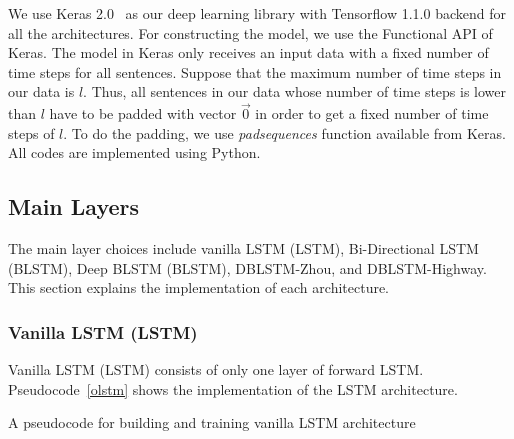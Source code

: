We use Keras 2.0~\citep{chollet2015} as our deep learning library with Tensorflow 1.1.0 backend for all the architectures. For constructing the model, we use the Functional API of Keras. The model in Keras only receives an input data with a fixed number of time steps for all sentences. Suppose that the maximum number of time steps in our data is $l$. Thus, all sentences in our data whose number of time steps is lower than $l$ have to be padded with vector $ \vec{0}$ in order to get a fixed number of time steps of $l$. To do the padding, we use \textit{padsequences} function available from Keras. All codes are implemented using Python.

\subsection{Main Layers}
The main layer choices include vanilla LSTM (LSTM), Bi-Directional LSTM (BLSTM), Deep BLSTM (BLSTM), DBLSTM-Zhou, and DBLSTM-Highway. This section explains the implementation of each architecture.

\subsubsection{Vanilla LSTM (LSTM)}
Vanilla LSTM (LSTM) consists of only one layer of forward LSTM. Pseudocode~\ref{olstm} shows the implementation of the LSTM architecture.

\begin{kode}

	
	\caption{A pseudocode for building and training vanilla LSTM architecture}
	\label{code:olstm}
\end{kode}

